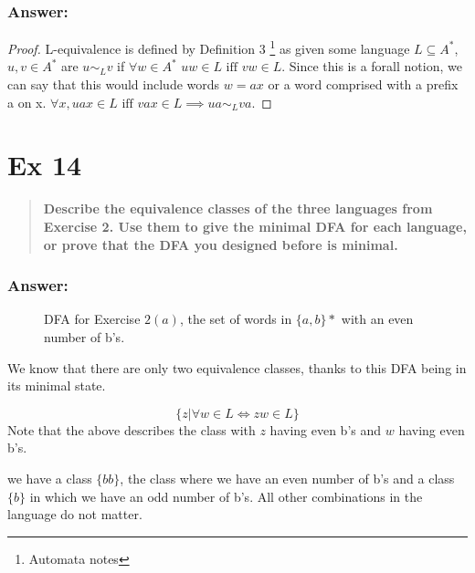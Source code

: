 \documentclass[titlepage]{article}\usepackage[]{graphicx}\usepackage[]{color}
\begin{document}
\subsubsection{Answer:}

\begin{proof}
L-equivalence is defined by Definition 3 \footnote{Automata notes} as given some
language $L \subseteq A^*$, $u,v \in A^*$ are $u \sim_L v$ if $\forall w \in
A^*\, \, uw \in L \text{ iff } vw \in L$. 
Since this is a forall notion, we can say that this would include words $w = ax$
or a word comprised with a prefix a on x. $\forall x, uax \in L \text{ iff } vax \in
L \implies ua \sim_L va$.
\end{proof}


\section*{Ex 14}
\begin{quote}
  \textbf{Describe the equivalence classes of the three languages from Exercise
  2. Use them to give the minimal DFA for each language, or prove that the DFA
  you designed before is minimal.}
\end{quote}
\subsubsection{Answer:}
  \begin{figure}[htp]
    \centering
    \caption{DFA for Exercise $2(a)$, the set of words in $\{a,b\}* $ with an
            even number of b's.}
  \end{figure}

  We know that there are only two equivalence classes, thanks to this DFA being
  in its minimal state. 

  \[ \{ z | \forall w \in L \Leftrightarrow zw \in L \} \]
  Note that the above describes the class with $z$ having even b's and $w$
  having even b's. 

  we have a class $\{bb\}$, the class where we have an even number of b's and a
  class $\{b\}$ in which we have an odd number of b's. All other combinations
  in the language do not matter.
\end{document}
